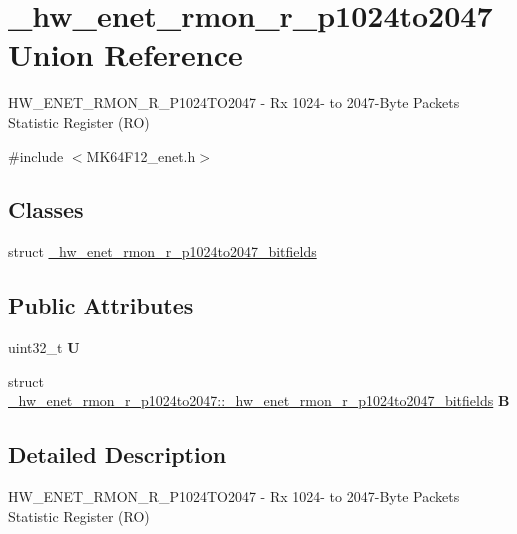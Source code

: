 \hypertarget{union__hw__enet__rmon__r__p1024to2047}{}\section{\+\_\+hw\+\_\+enet\+\_\+rmon\+\_\+r\+\_\+p1024to2047 Union Reference}
\label{union__hw__enet__rmon__r__p1024to2047}


H\+W\+\_\+\+E\+N\+E\+T\+\_\+\+R\+M\+O\+N\+\_\+\+R\+\_\+\+P1024\+T\+O2047 -\/ Rx 1024-\/ to 2047-\/\+Byte Packets Statistic Register (RO)  




{\ttfamily \#include $<$M\+K64\+F12\+\_\+enet.\+h$>$}

\subsection*{Classes}
\begin{DoxyCompactItemize}
\item 
struct \hyperlink{struct__hw__enet__rmon__r__p1024to2047_1_1__hw__enet__rmon__r__p1024to2047__bitfields}{\+\_\+hw\+\_\+enet\+\_\+rmon\+\_\+r\+\_\+p1024to2047\+\_\+bitfields}
\end{DoxyCompactItemize}
\subsection*{Public Attributes}
\begin{DoxyCompactItemize}
\item 
uint32\+\_\+t {\bfseries U}\hypertarget{union__hw__enet__rmon__r__p1024to2047_ada9e643549d1f3ab24fc0e104ba71af6}{}\label{union__hw__enet__rmon__r__p1024to2047_ada9e643549d1f3ab24fc0e104ba71af6}

\item 
struct \hyperlink{struct__hw__enet__rmon__r__p1024to2047_1_1__hw__enet__rmon__r__p1024to2047__bitfields}{\+\_\+hw\+\_\+enet\+\_\+rmon\+\_\+r\+\_\+p1024to2047\+::\+\_\+hw\+\_\+enet\+\_\+rmon\+\_\+r\+\_\+p1024to2047\+\_\+bitfields} {\bfseries B}\hypertarget{union__hw__enet__rmon__r__p1024to2047_a76557d9b8d9f5fe40e5617389479e683}{}\label{union__hw__enet__rmon__r__p1024to2047_a76557d9b8d9f5fe40e5617389479e683}

\end{DoxyCompactItemize}


\subsection{Detailed Description}
H\+W\+\_\+\+E\+N\+E\+T\+\_\+\+R\+M\+O\+N\+\_\+\+R\+\_\+\+P1024\+T\+O2047 -\/ Rx 1024-\/ to 2047-\/\+Byte Packets Statistic Register (RO) 

